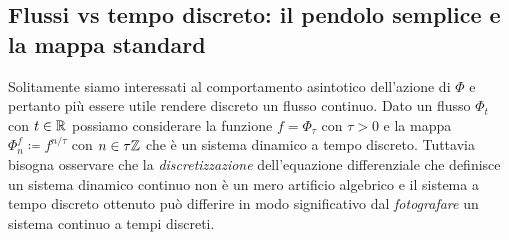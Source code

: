 \subsection{Flussi vs tempo discreto: il pendolo semplice e la mappa standard}
Solitamente siamo interessati al comportamento asintotico dell'azione di $ \Phi $ e pertanto più essere utile rendere discreto un flusso continuo. Dato un flusso $ \Phi_t $ con $ t \in \mathbb{R} $ possiamo considerare la funzione $ f = \Phi_{\tau} $ con $ \tau > 0 $ e la mappa $ \Phi_n^f \coloneqq f^{n/\tau} $ con $ n \in \tau \mathbb{Z} $ che è un sistema dinamico a tempo discreto. Tuttavia bisogna osservare che la \emph{discretizzazione} dell'equazione differenziale che definisce un sistema dinamico continuo non è un mero artificio algebrico e il sistema a tempo discreto ottenuto può differire in modo significativo dal \emph{fotografare} un sistema continuo a tempi discreti. 

